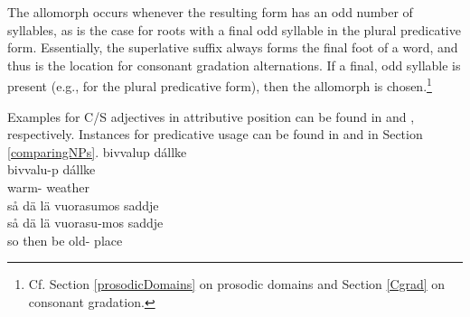 The allomorph  occurs whenever the resulting form has an odd number of syllables, as is the case for roots with a final odd syllable in the plural predicative form. %
Essentially, the superlative suffix always forms the final foot of a word, and thus is the location for consonant gradation alternations. If a final, odd syllable is present (e.g., for the plural predicative form), then the \mbox{} allomorph is chosen.\footnote{Cf. Section \ref{prosodicDomains} on prosodic domains and Section \ref{Cgrad} on consonant gradation.} 

Examples for C/S adjectives in attributive position can be found in  and , respectively. Instances for predicative usage can be found in  and  in Section \ref{comparingNPs}.
\ea\label{compATTRADJex1}
\glll	bivvalup dállke\\
	bivvalu-p dállke\\
	warm- weather\BS{}\\
{}	
\z
\ea\label{superlATTRADJex1}%
\glll	så dä lä vuorasumos saddje\\
	så dä lä vuorasu-mos saddje\\
	so then be\BS{} old- place\BS{}\\
{}	
\z

